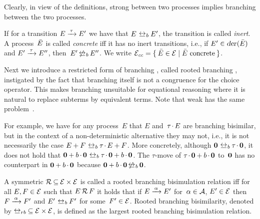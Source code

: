 \noindent
Clearly, in view of the definitions, strong {\bisimilarity} between two
processes implies branching {\bisimilarity} between the two processes.

If for a transition $E \arrow{\tau} E'$ we have that $E \brbisim E'$,
the transition is called \textit{inert}. A process~$\bar{E}$ is called
\textit{concrete} iff it has no inert transitions, i.e., if
$E'\in\textsl{der} \mkern1mu(\bar{E})$ and $E' \arrow{\tau} E''$, then~$E' \nbrbisim
E''$. We write $\mathcal{E}_{\mathit{cc}} = \lbrace \: \bar{E} \in \mathcal{E} \mid \mbox{$\bar{E}$
  concrete} \: \rbrace$.

\blankline

\noindent
Next we introduce a restricted form of branching {\bisimilarity}, called
rooted branching {\bisimilarity}, instigated by the fact that branching
{\bisimilarity} itself is not a congruence for the choice operator. This
makes branching {\bisimilarity} unsuitable for equational reasoning where
it is natural to replace subterms by equivalent terms. Note that weak
{\bisimilarity} has the same problem~\cite{Mil89:phi}.

For example, we have for any process~$E$ that $E$ and~$\tau \mathop{.} E$
are branching bisimilar, but in the context of a non-deterministic
alternative they may not, i.e., it is not necessarily the case $E + F
\brbisim \tau \pref E + F$. More concretely, although $\bfzero
\brbisim \tau \pref \bfzero$, it does not hold that $\bfzero + b \pref
\bfzero \brbisim \tau \pref \bfzero + b \pref \bfzero$. The
$\tau$-move of $\tau \mathop{.} \normalfont{\textbf{0}} + b \mathop{.} \normalfont{\textbf{0}}$ to~$\normalfont{\textbf{0}}$ has
no counterpart in $\normalfont{\textbf{0}} + b \mathop{.} \normalfont{\textbf{0}}$ because $\bfzero + b \pref
\bfzero \nbrbisim \bfzero$.

\begin{definition}
  \label{def-branching-bisimilarity}
  A symmetric $\mathcal{R} \mathbin\subseteq \mathcal{E} \times \mathcal{E}$ is called a
  rooted branching bisimulation relation iff for all $E, F \in \mathcal{E}$
  such that $E \,{\mathcal{R}}\, F$ it holds that if $E \arrow{\alpha} E'$
  for~$\alpha \in \mathcal{A}$, $E' \in \mathcal{E}$ then $F \arrow{\alpha} F'$
  and $E' \brbisim F'$ for some~$F' \in \mathcal{E}$. Rooted branching
  bisimilarity, denoted by
  ${\rootedbrbisim} \subseteq \calE \times \calE$, is defined as the
  largest rooted branching bisimulation relation.
\end{definition}

